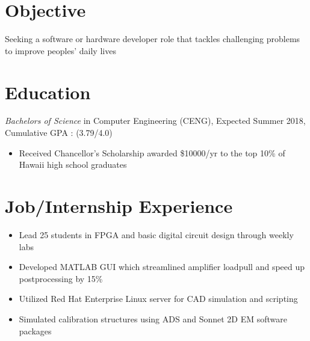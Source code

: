 \documentclass{resume}
\begin{document}
\raggedbottom
{}


\section{Objective}
Seeking a software or hardware developer role that tackles challenging problems to improve peoples' daily lives

\section{%
Education}
\textit{Bachelors of Science} in Computer Engineering (CENG), Expected Summer 2018, Cumulative GPA : (3.79/4.0)  
\begin{itemize}[noitemsep,nolistsep]
  \item Received Chancellor's Scholarship awarded \$10000/yr to the top 10\% of Hawaii high school graduates
\end{itemize}
\section{%
 Job/Internship Experience}

\begin{itemize}[noitemsep,nolistsep]
  \item Lead 25 students in FPGA and basic digital circuit design through weekly labs
\end{itemize} 

\begin{itemize}[noitemsep,nolistsep]
  \item Developed MATLAB GUI which streamlined amplifier loadpull and speed up postprocessing by 15\%
  \item Utilized Red Hat Enterprise Linux server for CAD simulation and scripting
  \item Simulated calibration structures using ADS and Sonnet 2D EM software packages
\end{itemize}
\end{document}
